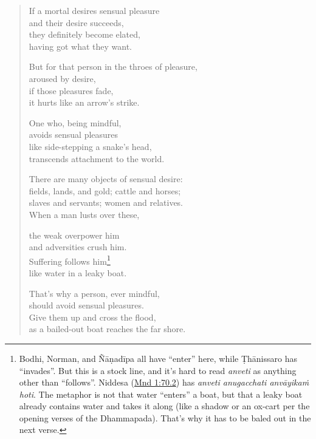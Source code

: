 \documentclass[12pt,openany]{book}%
\begin{document}
\begin{verse}%
If a mortal desires sensual pleasure \\
and their desire succeeds, \\
they definitely become elated, \\
having got what they want. 

But for that person in the throes of pleasure, \\
aroused by desire, \\
if those pleasures fade, \\
it hurts like an arrow’s strike. 

One who, being mindful, \\
avoids sensual pleasures \\
like side-stepping a snake’s head, \\
transcends attachment to the world. 

There are many objects of sensual desire: \\
fields, lands, and gold; cattle and horses; \\
slaves and servants; women and relatives. \\
When a man lusts over these, 

the weak overpower him \\
and adversities crush him. \\
Suffering follows him\footnote{Bodhi, Norman, and \textsanskrit{Ñāṇadīpa} all have “enter” here, while \textsanskrit{Ṭhānissaro} has “invades”. But this is a stock line, and it’s hard to read \textit{anveti} as anything other than “follows”. Niddesa (\href{https://suttacentral.net/mnd1/en/sujato\#70.2}{Mnd 1:70.2}) has \textit{anveti anugacchati \textsanskrit{anvāyikaṁ} hoti}. The metaphor is not that water “enters” a boat, but that a leaky boat already contains water and takes it along (like a shadow or an ox-cart per the opening verses of the Dhammapada). That’s why it has to be baled out in the next verse. } \\
like water in a leaky boat. 

That’s why a person, ever mindful, \\
should avoid sensual pleasures. \\
Give them up and cross the flood, \\
as a bailed-out boat reaches the far shore. 

%
\end{verse}
\end{document}

